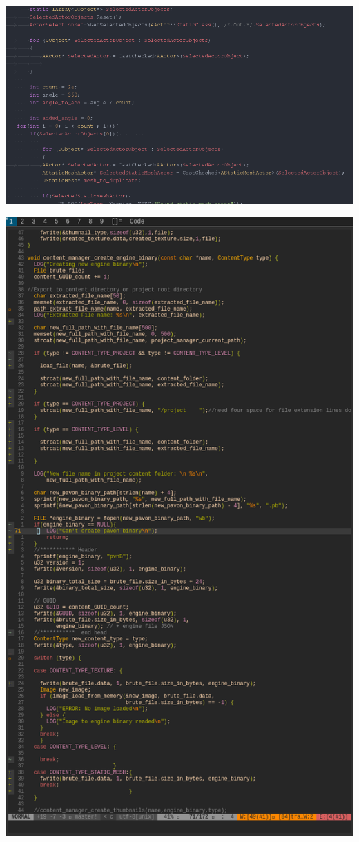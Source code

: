 \documentclass{article}
\begin{document}
  \includegraphics[width=\textwidth]{53.png}

  \includegraphics[width=\textwidth]{55.png}
\end{document}
